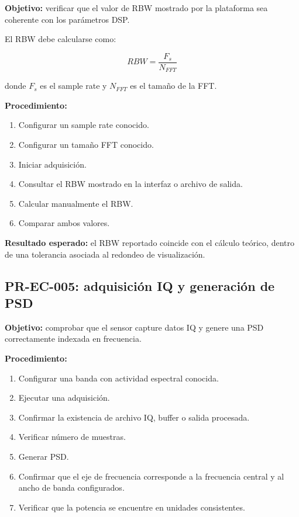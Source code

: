 \textbf{Objetivo:} verificar que el valor de RBW mostrado por la plataforma sea coherente con los parámetros DSP.

El RBW debe calcularse como:

\[
RBW = \frac{F_s}{N_{FFT}}
\]

donde $F_s$ es el sample rate y $N_{FFT}$ es el tamaño de la FFT.

\textbf{Procedimiento:}

\begin{enumerate}
    \item Configurar un sample rate conocido.
    \item Configurar un tamaño FFT conocido.
    \item Iniciar adquisición.
    \item Consultar el RBW mostrado en la interfaz o archivo de salida.
    \item Calcular manualmente el RBW.
    \item Comparar ambos valores.
\end{enumerate}

\textbf{Resultado esperado:} el RBW reportado coincide con el cálculo teórico, dentro de una tolerancia asociada al redondeo de visualización.

\subsection{PR-EC-005: adquisición IQ y generación de PSD}

\textbf{Objetivo:} comprobar que el sensor capture datos IQ y genere una PSD correctamente indexada en frecuencia.

\textbf{Procedimiento:}

\begin{enumerate}
    \item Configurar una banda con actividad espectral conocida.
    \item Ejecutar una adquisición.
    \item Confirmar la existencia de archivo IQ, buffer o salida procesada.
    \item Verificar número de muestras.
    \item Generar PSD.
    \item Confirmar que el eje de frecuencia corresponde a la frecuencia central y al ancho de banda configurados.
    \item Verificar que la potencia se encuentre en unidades consistentes.
\end{enumerate}

